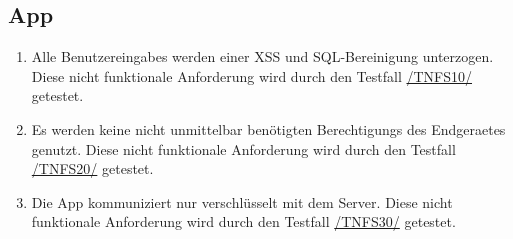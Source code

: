 \subsection*{App}

\begin{samepage}
    \begin{enumerate}[label=\textbf{/NFS\arabic*0/}, align=left]
        \item \label{/NFS10/} Alle \Glspl{Benutzereingabe} werden einer \Gls{XSS} und \Gls{SQL}-Bereinigung unterzogen. Diese nicht funktionale Anforderung wird durch den Testfall \hyperref[/TNFS10/]{/TNFS10/} getestet.
        \item \label{/NFS20/} Es werden keine nicht unmittelbar benötigten \Glspl{Berechtigung} des \Gls{Endgeraet}es genutzt. Diese nicht funktionale Anforderung wird durch den Testfall \hyperref[/TNFS20/]{/TNFS20/} getestet.
        \item \label{/NFS30/} Die App kommuniziert nur verschlüsselt mit dem \Gls{Server}. Diese nicht funktionale Anforderung wird durch den Testfall \hyperref[/TNFS30/]{/TNFS30/} getestet.
    \end{enumerate}
\end{samepage}